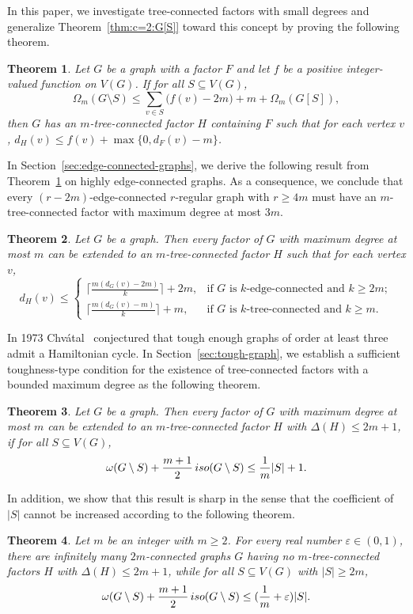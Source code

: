 \documentclass[10pt,bezier]{article}
\newtheorem{prethm}{{\bf Theorem}}[section]
\newenvironment{thm}{\begin{prethm}{\hspace{-0.5
em}{\bf.}}}{\end{prethm}}
\begin{document}
In this paper, we investigate tree-connected factors with small degrees
 and generalize Theorem~\ref{thm:c=2:G[S]} toward this concept by proving the following theorem.
%
%
\begin{thm}\label{intro:thm:sufficient}
Let $G$ be a graph with a factor $F$ and let $f$ be a positive integer-valued function on $V(G)$.
If for all $S\subseteq V(G)$, $$\Omega_m(G\setminus S)\le \sum_{v\in S}\big(f(v)-2m\big)+m+\Omega_m(G[ S]),$$
then $G$ has an $m$-tree-connected factor $H$ containing $F$ such that for each vertex $v$,
 $d_H(v)\le f(v)+\max\{0, d_F(v)-m\}$.
\end{thm}

In Section~\ref{sec:edge-connected-graphs}, we derive the following result from Theorem~\ref{intro:thm:sufficient} on highly edge-connected graphs. As a consequence, we conclude that every $(r-2m)$-edge-connected $r$-regular graph with $r\ge 4m$ must have an $m$-tree-connected factor with maximum degree at most $3m$. 
%
\begin{thm}
{Let $G$ be a graph. Then every factor of $G$ with maximum degree at most $m$ can be extended to an $m$-tree-connected factor $H$ such that for each vertex $v$, 
$$d_H(v)\le 
 \begin{cases}
\lceil \frac{m(d_G(v)-2m)}{k}\rceil+2m,	&\text{if $G$ is $k$-edge-connected and $k\ge 2m$};\\ 
\lceil \frac{m(d_G(v)-m)}{k}\rceil+m,	&\text{if $G$ is $k$-tree-connected and $k\ge m$}.
\end {cases}$$
}\end{thm}
%
%

In 1973 Chv\'atal~\cite{Chvatal-1973} conjectured that tough enough graphs of order at least three admit a Hamiltonian cycle.
In Section~\ref{sec:tough-graph}, we establish a sufficient toughness-type condition for the existence of tree-connected factors with a bounded maximum degree as the following theorem. 
%

\begin{thm}\label{intro:thm:tough-m2:verify}
{Let $G$ be a graph. Then every factor of $G$ with maximum degree at most $m$ can be extended to an $m$-tree-connected factor $H$ with $\Delta(H)\le 2m+1$, if for all $S\subseteq V(G)$, 
$$ \omega(G\setminus S)+\small {\frac{m+1}{2}}\, iso(G\setminus S) \le \frac{1}{m}|S|+1.$$
}\end{thm}
%

In addition, we show that this result is sharp in the sense that the coefficient of $|S|$ cannot be increased according to the following theorem.
%
\begin{thm}
{Let $m$ be an integer with $m\ge 2$. For every real number $\varepsilon \in (0,1)$, there are infinitely many $2m$-connected graphs $G$ having no $m$-tree-connected factors $H$ with $\Delta(H)\le 2m+1$, while for all $S\subseteq V(G)$ with $|S|\ge 2m$, 
$$ \omega(G\setminus S)+\small {\frac{m+1}{2}}\, iso(G\setminus S) \le (\frac{1}{m}+\varepsilon)|S|.$$
}\end{thm}
%
\end{document}
